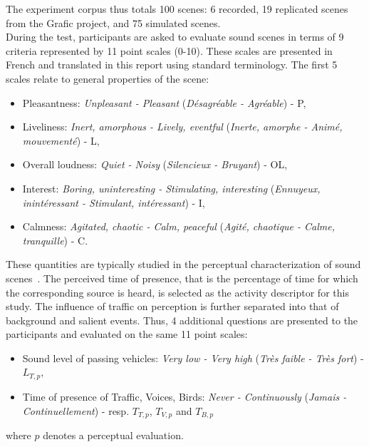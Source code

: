 \documentclass[twocolumn]{article}
\begin{document}
The experiment corpus thus totals 100 scenes: 6 recorded, 19 replicated scenes from the Grafic project, and 75 simulated scenes.\\


During the test, participants are asked to evaluate sound scenes in terms of 9 criteria represented by 11 point scales (0-10). These scales are presented in French and translated in this report using standard terminology. The first 5 scales relate to general properties of the scene:
\begin{itemize}
\item Pleasantness: \textit{Unpleasant - Pleasant} (\textit{D\'esagr\'eable - Agr\'eable}) - P,
\item Liveliness: \textit{Inert, amorphous - Lively, eventful} (\textit{Inerte, amorphe - Anim\'e, mouvement\'e}) - L,
\item Overall loudness: \textit{Quiet - Noisy} (\textit{Silencieux - Bruyant}) - OL,
\item Interest: \textit{Boring, uninteresting - Stimulating, interesting} (\textit{Ennuyeux, inint\'eressant - Stimulant, int\'eressant}) - I,
\item Calmness: \textit{Agitated, chaotic - Calm, peaceful} (\textit{Agit\'e, chaotique - Calme, tranquille}) - C.
\end{itemize}

These quantities are typically studied in the perceptual characterization of sound scenes~\cite{axelsson2010, aumond2017, nilsson2007}. The perceived time of presence, that is the percentage of time for which the corresponding source is heard, is selected as the activity descriptor for this study. The influence of traffic on perception is further separated into that of background and salient events. Thus, 4 additional questions are presented to the participants and evaluated on the same 11 point scales:
\begin{itemize}
\item Sound level of passing vehicles: \textit{Very low - Very high} (\textit{Tr\`es faible - Tr\`es fort}) - $L_{T, p}$,
\item Time of presence of Traffic, Voices, Birds: \textit{Never - Continuously} (\textit{Jamais - Continuellement}) - resp. $T_{T, p}$, $T_{V, p}$ and $T_{B, p}$
\end{itemize}
where $p$ denotes a perceptual evaluation.
\end{document}
